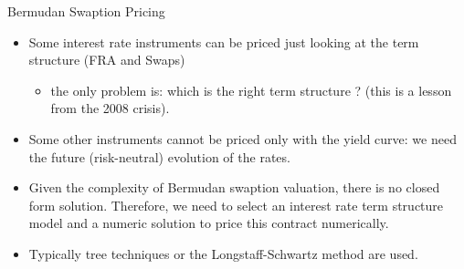 \documentclass{beamer}
\begin{document}

\begin{frame}{Bermudan Swaption Pricing}
\begin{itemize}
	\item<1-> Some interest rate instruments can be priced just looking at the term structure (FRA and Swaps)
	\begin{itemize}
		\item the only problem is: which is the right term structure ? (this is a lesson from the 2008 crisis).
	\end{itemize}
	\item<2-> Some other instruments cannot be priced only with the yield curve: we need the future (risk-neutral) evolution of the rates.
	\item<3-> Given the complexity of Bermudan swaption valuation, there is no closed form solution. Therefore, we need to select an interest rate term structure model and a numeric solution to price this contract numerically.		
	\item<4-> Typically tree techniques or the Longstaff-Schwartz method are used.
\end{itemize}
\end{frame}
\end{document}
